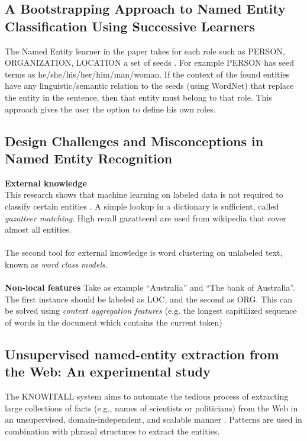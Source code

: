 \documentclass{article}
\begin{document}
\subsection*{A Bootstrapping Approach to Named Entity Classification Using Successive Learners}
The Named Entity learner in the paper takes for each role such as PERSON, ORGANIZATION, LOCATION a set of seeds \cite{niu2003bootstrapping}. For example PERSON has seed terms as he/she/his/her/him/man/woman. If the context of the found entities have any linguistic/semantic relation to the seeds (using WordNet) that replace the entity in the sentence, then that entity must belong to that role. This approach gives the user the option to define his own roles.

\subsection*{Design Challenges and Misconceptions in Named Entity Recognition}
\textbf{External knowledge}\\
This research shows that machine learning on labeled data is not required to classify certain entities \cite{ratinov2009design}. A simple lookup in a dictionary is sufficient, called \textit{gazatteer matching}. High recall gazatteerd are used from wikipedia that cover almost all entities.\\\\
The second tool for external knowledge is word clustering on unlabeled text, known as \textit{word class models}.\\\\
\textbf{Non-local features}
Take as example “Australia” and “The bank of Australia”. The first instance should be labeled
as LOC, and the second as ORG. This can be solved using \textit{context aggregation features} (e.g. the longest capitilized sequence of words in the document which contains the current token)

\subsection*{Unsupervised named-entity extraction from the Web: An experimental study}
The KNOWITALL system aims to automate the tedious process of extracting large collections of
facts (e.g., names of scientists or politicians) from the Web in an unsupervised, domain-independent,
and scalable manner \cite{etzioni2005unsupervised}. Patterns are used in combination with phrasal structures to extract the entities.
\end{document}
